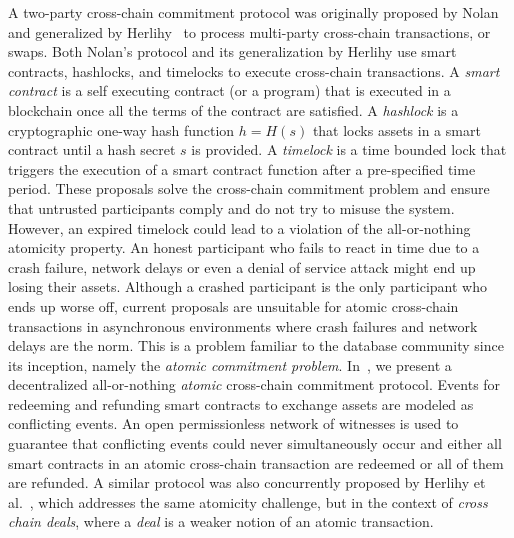 \documentclass[11pt]{article}
\begin{document}
A two-party cross-chain commitment protocol was originally proposed by 
Nolan~\cite{atomicNolan} and generalized by 
Herlihy~\cite{herlihy2018atomic} to process multi-party cross-chain transactions, or swaps.
Both Nolan's protocol and its generalization by Herlihy use smart contracts, hashlocks,
and timelocks to execute cross-chain transactions. A {\em smart contract} is a self executing
contract (or a program) that is executed in a blockchain 
once all the terms of the contract are satisfied. A {\em hashlock} is 
a cryptographic one-way hash function $h = H(s)$ that locks
assets in a smart contract until a hash secret $s$ is provided. A {\em timelock} is a time 
bounded lock that triggers the execution of a smart contract function
after a pre-specified time period. 
These proposals solve the cross-chain commitment problem and ensure that untrusted participants comply and do not try to misuse the system.
However, an expired timelock could lead to a violation of the all-or-nothing
atomicity property. An honest participant who fails to react in time due to a crash failure, network delays or even a denial of service attack 
might end up losing their assets. Although a crashed participant
is the only participant who ends up worse off, current proposals are
unsuitable for atomic cross-chain transactions in asynchronous 
environments where crash failures and network delays are the norm. 
This is a problem familiar to the database community since its inception, namely the {\em atomic commitment problem}.  In~\cite{zakhary2020atomic}, we present a decentralized all-or-nothing \textit{atomic} cross-chain commitment protocol.  Events for redeeming and refunding smart contracts to exchange assets are 
modeled as conflicting events. An open permissionless network of witnesses is 
used to guarantee that conflicting events could never simultaneously occur 
and either all smart contracts in an atomic cross-chain transaction
are redeemed or all of them are refunded.  A similar protocol was also concurrently proposed by Herlihy et al.~\cite{Herlihy2020VLDB}, which addresses the same atomicity challenge, but in the context of {\em cross chain deals}, where a {\em deal} is a weaker notion of an atomic transaction.
\end{document}
